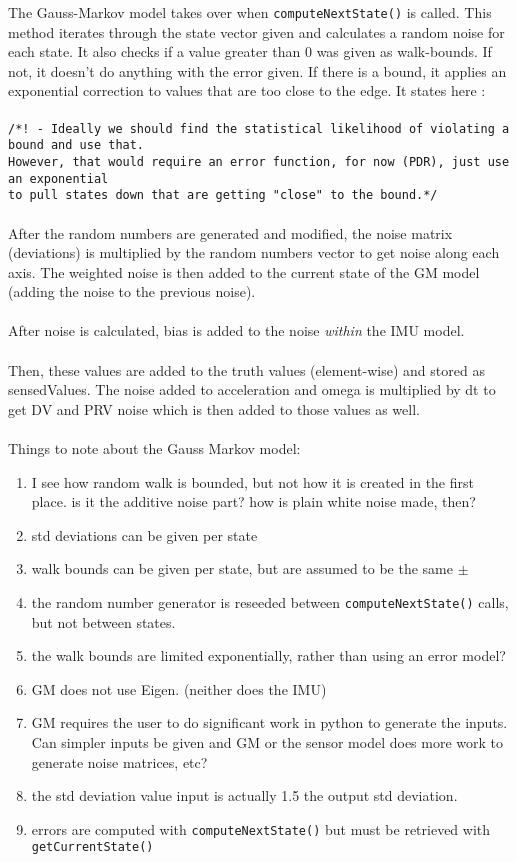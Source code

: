 \documentclass[]{BasiliskReportMemo}
\begin{document}
The Gauss-Markov model takes over when \verb|computeNextState()| is called. This method iterates through the state vector given and calculates a random noise for each state. It also checks if a value greater than 0 was given as walk-bounds. If not, it doesn't do anything with the error given. If there is a bound, it applies an exponential correction to values that are too close to the edge. It states here :\\\\
\verb|/*! - Ideally we should find the statistical likelihood of violating a bound and use that.|\\
\verb|However, that would require an error function, for now (PDR), just use an exponential |\\
\verb|to pull states down that are getting "close" to the bound.*/|\\\\
After the random numbers are generated and modified, the noise matrix (deviations) is multiplied by the random numbers vector to get noise along each axis. The weighted noise is then added to the current state of the GM model (adding the noise to the previous noise).\\\\
After noise is calculated, bias is added to the noise \textit{within} the IMU model.\\\\
Then, these values are added to the truth values (element-wise) and stored as sensedValues. The noise added to acceleration and omega is multiplied by dt to get DV and PRV noise which is then added to those values as well.\\\\
Things to note about the Gauss Markov model:
\begin{enumerate}
	\item I see how random walk is bounded, but not how it is created in the first place. is it the additive noise part? how is plain white noise made, then?
	\item std deviations can be given per state
	\item walk bounds can be given per state, but are assumed to be the same $\pm$
	\item the random number generator is reseeded between \verb|computeNextState()| calls, but not between states.
	\item the walk bounds are limited exponentially, rather than using an error model?
	\item GM does not use Eigen. (neither does the IMU)
	\item GM requires the user to do significant work in python to generate the inputs. Can simpler inputs be given and GM or the sensor model does more work to generate noise matrices, etc?
	\item the std deviation value input is actually 1.5 the output std deviation.
	\item errors are computed with \verb|computeNextState()| but must be retrieved with \verb|getCurrentState()|
\end{enumerate}
\end{document}
